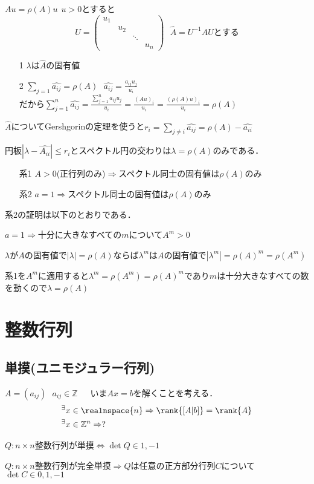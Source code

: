 $Au=\rho (A)u\ \ u>0$とすると
\begin{equation*}
  U=
  \begin{pmatrix}
    u_1&&&\\
    &u_2&&\\
    &&\ddots&\\
    &&&u_n
  \end{pmatrix}\ \ \ \hat{A}=U^{-1}AUとする
\end{equation*}
\begin{itemize}
  \item[1]$\lambda$は$\hat{A}$の固有値\\
  \item[2]$\sum_{j=1}\hat{a_{ij}}=\rho (A)\ \ \ \hat{a_{ij}}=\displaystyle\frac{a_{ij}u_j}{u_i}$\\
  だから$\sum_{j=1}^n \hat{a_{ij}}=\displaystyle\frac{\sum_{j=1}^n a_{ij}u_j}{u_i}=\frac{{(Au)}_i}{u_i}=\frac{{(\rho (A)u)}_i}{u_i}=\rho (A)$
\end{itemize}

$\hat{A}$についてGershgorinの定理を使うと$r_i = \sum_{j\neq i}\hat{a_{ij}}=\rho (A)-\hat{a_{ii}}$

円板$|\lambda -\hat{A_{ii}}|\leq r_i$とスペクトル円の交わりは$\lambda =\rho (A)$のみである．
\begin{itemize}
  \item[系1]$A>0$(正行列のみ)$\Rightarrow$スペクトル同士の固有値は$\rho (A)$のみ\\
  \item[系2]$a=1\Rightarrow$スペクトル同士の固有値は$\rho (A)$のみ
\end{itemize}

系2の証明は以下のとおりである．

$a=1\Rightarrow$十分に大きなすべての$m$について$A^m >0$

$\lambda$が$A$の固有値で$|\lambda |=\rho (A)$ならば${\lambda}^m$は$A$の固有値で$|{\lambda}^m |={\rho (A)}^m=\rho (A^m )$

系1を$A^m$に適用すると${\lambda}^m =\rho (A^m )={\rho (A)}^m$であり$m$は十分大きなすべての数を動くので$\lambda =\rho (A)$
\section{整数行列}
\subsection{単摸(ユニモジュラー行列)}
$A=(a_{ij})\ \ \ a_{ij}\in\mathbb{Z}$\ \ \ いま$Ax=b$を解くことを考える．
\begin{align*}
  &{}^{\exists}x\in\realnspace{n}\Rightarrow \rank{[A|b]}=\rank{A}\\
  &{}^{\exists}x\in{\mathbb{Z}}^n \Rightarrow ?
\end{align*}
\begin{dfn}
  $Q:n\times n$整数行列が単摸$\Leftrightarrow\det Q\in {1,-1}$
\end{dfn}
\begin{dfn}
  $Q:n\times n$整数行列が完全単摸$\Rightarrow Q$は任意の正方部分行列$C$について$\det C\in {0,1,-1}$
\end{dfn}

